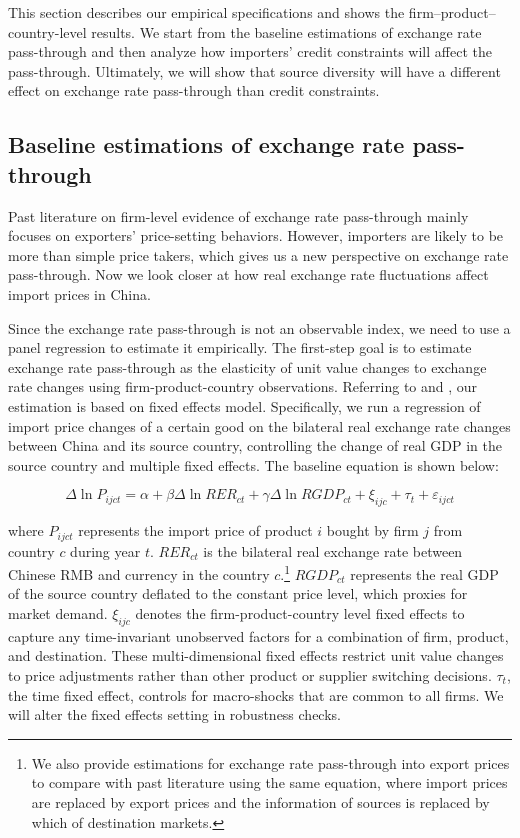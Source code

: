 This section describes our empirical specifications and shows the firm–product–country-level results. We start from the baseline estimations of exchange rate pass-through and then analyze how importers' credit constraints will affect the pass-through. Ultimately, we will show that source diversity will have a different effect on exchange rate pass-through than credit constraints.

\subsection{Baseline estimations of exchange rate pass-through} \label{Empirical-Baseline}

Past literature on firm-level evidence of exchange rate pass-through mainly focuses on exporters' price-setting behaviors. However, importers are likely to be more than simple price takers, which gives us a new perspective on exchange rate pass-through. Now we look closer at how real exchange rate fluctuations affect import prices in China.

Since the exchange rate pass-through is not an observable index, we need to use a panel regression to estimate it empirically. The first-step goal is to estimate exchange rate pass-through as the elasticity of unit value changes to exchange rate changes using firm-product-country observations. Referring to \cite{aik2014} and \cite{lmx2015}, our estimation is based on fixed effects model. Specifically, we run a regression of import price changes of a certain good on the bilateral real exchange rate changes between China and its source country, controlling the change of real GDP in the source country and multiple fixed effects. The baseline equation is shown below:

\begin{equation}
	\Delta \ln P_{i j c t}=\alpha+\beta \Delta \ln R E R_{c t}+\gamma \Delta \ln R G D P_{c t}+\xi_{i j c}+\tau_{t}+\varepsilon_{i j c t}
	\label{eq.baseline}
\end{equation}

where $P_{ijct}$ represents the import price of product $i$ bought by firm $j$ from country $c$ during year $t$. $R E R_{c t}$ is the bilateral real exchange rate between Chinese RMB and currency in the country $c$.\footnote{We also provide estimations for exchange rate pass-through into export prices to compare with past literature using the same equation, where import prices are replaced by export prices and the information of sources is replaced by which of destination markets.} $RGDP_{ct}$ represents the real GDP of the source country deflated to the constant price level, which proxies for market demand. $\xi_{ijc}$ denotes the firm-product-country level fixed effects to capture any time-invariant unobserved factors for a combination of firm, product, and destination. These multi-dimensional fixed effects restrict unit value changes to price adjustments rather than other product or supplier switching decisions. $\tau_t$, the time fixed effect, controls for macro-shocks that are common to all firms. We will alter the fixed effects setting in robustness checks.

